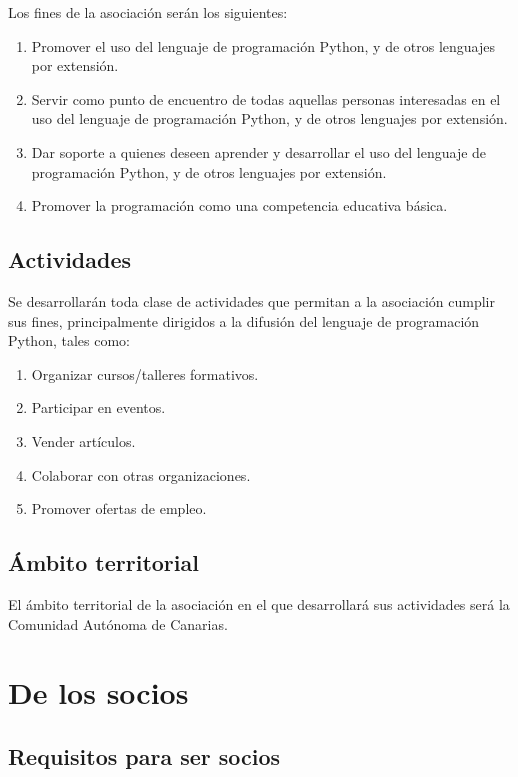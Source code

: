 \documentclass[a4paper, 12pt, oneside]{book}
\begin{document}
Los fines de la asociación serán los siguientes:

\begin{enumerate}
    \item Promover el uso del lenguaje de programación Python, y de otros lenguajes por extensión.
    \item Servir como punto de encuentro de todas aquellas personas interesadas en el uso del lenguaje de programación Python, y de otros lenguajes por extensión.
    \item Dar soporte a quienes deseen aprender y desarrollar el uso del lenguaje de programación Python, y de otros lenguajes por extensión.
    \item Promover la programación como una competencia educativa básica.
\end{enumerate}

\section{Actividades}

Se desarrollarán toda clase de actividades que permitan a la asociación cumplir sus fines, principalmente dirigidos a la difusión del lenguaje de programación Python, tales como:

\begin{enumerate}
    \item Organizar cursos/talleres formativos.
    \item Participar en eventos.
    \item Vender artículos.
    \item Colaborar con otras organizaciones.
    \item Promover ofertas de empleo.
\end{enumerate}

\section{Ámbito territorial}

El ámbito territorial de la asociación en el que desarrollará sus actividades será la Comunidad Autónoma de Canarias.

\chapter{De los socios}

\section{Requisitos para ser socios}
\end{document}
